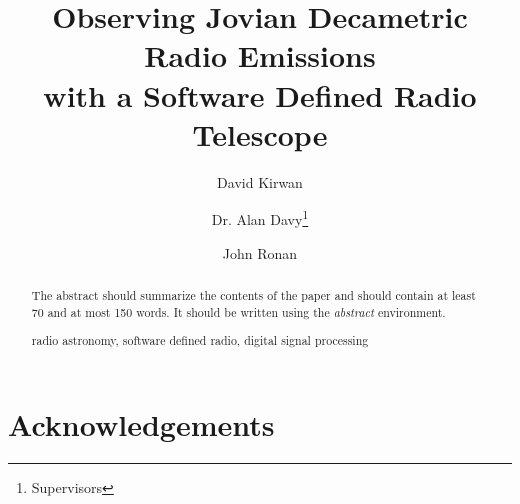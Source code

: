 \documentclass[runningheads,a4paper]{llncs}
\newcommand{\keywords}[1]{\par\addvspace\baselineskip
\noindent\keywordname\enspace\ignorespaces#1}
\begin{document}
\mainmatter  %

\title{Observing Jovian Decametric Radio Emissions\\
with a Software Defined Radio Telescope}


%
%
\author{David Kirwan%
\and Dr. Alan Davy\thanks{Supervisors} \and John Ronan\footnotemark[1]}
%


%
%
\maketitle
%
\begin{abstract}
The abstract should summarize the contents of the paper and should
contain at least 70 and at most 150 words. It should be written using the
\emph{abstract} environment.
\keywords{radio astronomy, software defined radio, digital signal processing}
\end{abstract}
%

\newpage
\chapter*{Acknowledgements}
\end{document}
